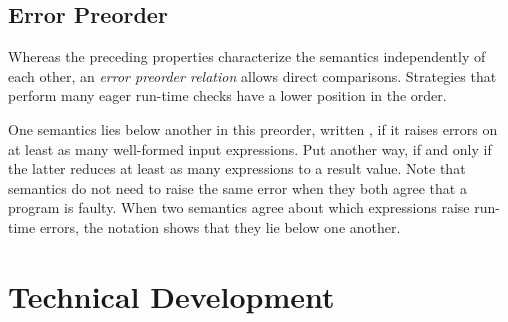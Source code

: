 \documentclass[ twoside,open=right,titlepage,numbers=noenddot,headinclude,%
                footinclude=true,cleardoublepage=empty,abstract=off,
                BCOR=5mm,paper=a4,fontsize=11pt,%
                ngerman,american,%
                parts,pdfspacing]{scrreprt}
\let\SOriginalthesubsubsection\thesubsubsection
\newcommand{\Ssubsection}[2]{\subsection[#1]{#2}\let\thesubsubsection\SOriginalthesubsubsection}
\newcommand{\Ssubsubsection}[2]{\subsubsection[#1]{#2}}
\renewcommand{\Ssubsection}[2]{\section[#1]{#2}}
\renewcommand{\Ssubsubsection}[2]{\subsection[#1]{#2}}
\begin{document}
\Ssubsubsection{Error Preorder}{Error Preorder}\label{t:x28part_x22secx3adesignx3abasicx3apreorderx22x29}

Whereas the preceding properties characterize the semantics independently of each other,
 an \emph{error preorder relation} allows direct comparisons.
Strategies that perform many eager run{-}time checks have a lower position in
 the order.

One semantics lies below another in this preorder,
 written \relax{$\xsym \sbehaviorle \ysym$},
 if it raises errors on at least as many well{-}formed input expressions.
Put another way,
 \relax{$\xsym{} \sbehaviorle \ysym{}$}
 if and only if the latter reduces at least as many expressions to a result value.
Note that semantics do not need to raise the same error when they both agree
 that a program is faulty.
When two semantics agree about which expressions raise run{-}time errors,
 the notation \relax{$\xsym{} \sbehavioreq \ysym{}$} shows that they lie below one
 another.



\Ssubsection{Technical Development}{Technical Development}\label{t:x28part_x22secx3adesignx3atechnicalx22x29}
\end{document}
